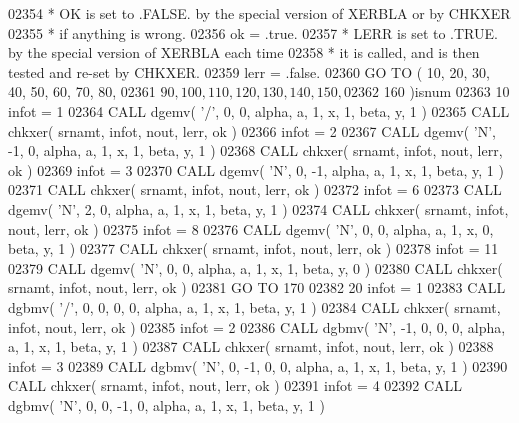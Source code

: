 \begin{DoxyCode}
02354 \textcolor{comment}{*     OK is set to .FALSE. by the special version of XERBLA or by CHKXER}
02355 \textcolor{comment}{*     if anything is wrong.}
02356       ok = .true.
02357 \textcolor{comment}{*     LERR is set to .TRUE. by the special version of XERBLA each time}
02358 \textcolor{comment}{*     it is called, and is then tested and re-set by CHKXER.}
02359       lerr = .false.
02360       \textcolor{keywordflow}{GO TO} ( 10, 20, 30, 40, 50, 60, 70, 80,
02361      $        90, 100, 110, 120, 130, 140, 150,
02362      $        160 )isnum
02363    10 infot = 1
02364       \textcolor{keyword}{CALL }dgemv( \textcolor{stringliteral}{'/'}, 0, 0, alpha, a, 1, x, 1, beta, y, 1 )
02365       \textcolor{keyword}{CALL }chkxer( srnamt, infot, nout, lerr, ok )
02366       infot = 2
02367       \textcolor{keyword}{CALL }dgemv( \textcolor{stringliteral}{'N'}, -1, 0, alpha, a, 1, x, 1, beta, y, 1 )
02368       \textcolor{keyword}{CALL }chkxer( srnamt, infot, nout, lerr, ok )
02369       infot = 3
02370       \textcolor{keyword}{CALL }dgemv( \textcolor{stringliteral}{'N'}, 0, -1, alpha, a, 1, x, 1, beta, y, 1 )
02371       \textcolor{keyword}{CALL }chkxer( srnamt, infot, nout, lerr, ok )
02372       infot = 6
02373       \textcolor{keyword}{CALL }dgemv( \textcolor{stringliteral}{'N'}, 2, 0, alpha, a, 1, x, 1, beta, y, 1 )
02374       \textcolor{keyword}{CALL }chkxer( srnamt, infot, nout, lerr, ok )
02375       infot = 8
02376       \textcolor{keyword}{CALL }dgemv( \textcolor{stringliteral}{'N'}, 0, 0, alpha, a, 1, x, 0, beta, y, 1 )
02377       \textcolor{keyword}{CALL }chkxer( srnamt, infot, nout, lerr, ok )
02378       infot = 11
02379       \textcolor{keyword}{CALL }dgemv( \textcolor{stringliteral}{'N'}, 0, 0, alpha, a, 1, x, 1, beta, y, 0 )
02380       \textcolor{keyword}{CALL }chkxer( srnamt, infot, nout, lerr, ok )
02381       \textcolor{keywordflow}{GO TO} 170
02382    20 infot = 1
02383       \textcolor{keyword}{CALL }dgbmv( \textcolor{stringliteral}{'/'}, 0, 0, 0, 0, alpha, a, 1, x, 1, beta, y, 1 )
02384       \textcolor{keyword}{CALL }chkxer( srnamt, infot, nout, lerr, ok )
02385       infot = 2
02386       \textcolor{keyword}{CALL }dgbmv( \textcolor{stringliteral}{'N'}, -1, 0, 0, 0, alpha, a, 1, x, 1, beta, y, 1 )
02387       \textcolor{keyword}{CALL }chkxer( srnamt, infot, nout, lerr, ok )
02388       infot = 3
02389       \textcolor{keyword}{CALL }dgbmv( \textcolor{stringliteral}{'N'}, 0, -1, 0, 0, alpha, a, 1, x, 1, beta, y, 1 )
02390       \textcolor{keyword}{CALL }chkxer( srnamt, infot, nout, lerr, ok )
02391       infot = 4
02392       \textcolor{keyword}{CALL }dgbmv( \textcolor{stringliteral}{'N'}, 0, 0, -1, 0, alpha, a, 1, x, 1, beta, y, 1 )

\end{DoxyCode}
